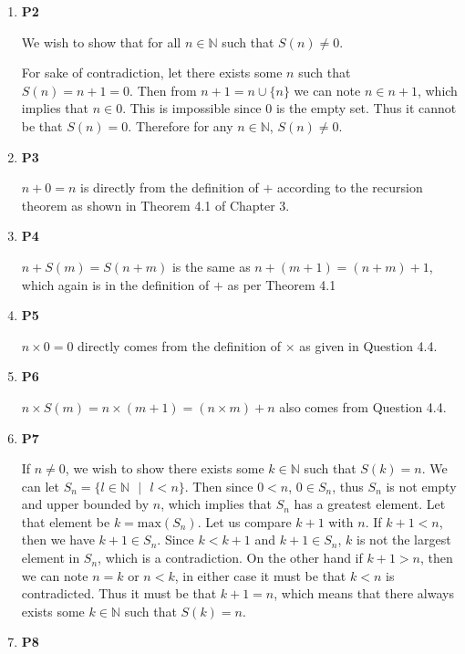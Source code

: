 \documentclass{article}
\begin{document}
\begin{enumerate}
\begin{enumerate}
			\item \textbf{P2}
			
			We wish to show that for all $n \in \mathbb{N}$ such that $S(n) \neq 0$.
			
			For sake of contradiction, let there exists some $n$ such that $S(n) = n + 1 = 0$. Then from $n + 1 = n \cup \{n\}$ we can note $n \in n + 1$, which implies that $n \in 0$. This is impossible since $0$ is the empty set. Thus it cannot be that $S(n) = 0$. Therefore for any $n \in \mathbb{N}$, $S(n) \neq 0$.
			
			\item \textbf{P3}
			
			$n + 0 = n$ is directly from the definition of $+$ according to the recursion theorem as shown in Theorem 4.1 of Chapter 3.
			
			\item \textbf{P4}
			
			$n + S(m) = S(n + m)$ is the same as $n + (m + 1) = (n + m) + 1$, which again is in the definition of $+$ as per Theorem 4.1
			
			\item \textbf{P5}
			
			$n \times 0 = 0$ directly comes from the definition of $\times$ as given in Question 4.4.
			
			\item \textbf{P6}
			
			$n \times S(m) = n \times (m + 1) = (n \times m) + n$ also comes from Question 4.4.
			
			\item \textbf{P7}
			
			If $n \neq 0$, we wish to show there exists some $k \in \mathbb{N}$ such that $S(k) = n$. We can let $S_n = \{l \in \mathbb{N} \text{ } | \text{ } l < n\}$. Then since $0 < n$, $0 \in S_n$, thus $S_n$ is not empty and upper bounded by $n$, which implies that $S_n$ has a greatest element. Let that element be $k = \text{max}(S_n)$. Let us compare $k + 1$ with $n$. If $k + 1 < n$, then we have $k + 1 \in S_n$. Since $k < k + 1$ and $k + 1 \in S_n$, $k$ is not the largest element in $S_n$, which is a contradiction. On the other hand if $k + 1 > n$, then we can note $n = k$ or $n < k$, in either case it must be that $k < n$ is contradicted. Thus it must be that $k + 1 = n$, which means that there always exists some $k \in \mathbb{N}$ such that $S(k) = n$.
			
			\item \textbf{P8}
			

\end{enumerate}
\end{enumerate}
\end{document}
